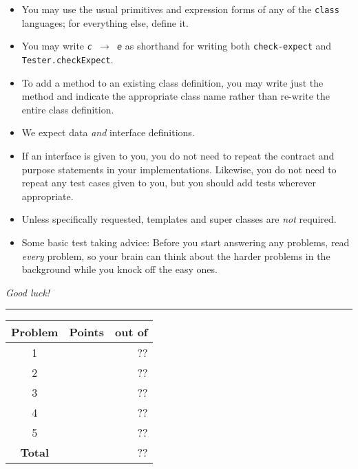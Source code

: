 \documentclass[12pt]{article}                   %
\newcommand\code[1]{\texttt{#1}}
\begin{document}
\noindent\begin{minipage}{8cm}\sloppy
\begin{itemize}
\item You may use the usual primitives and expression forms of any of
  the \code{class} languages; for everything else, define it.

\item You may write {\tt {\slshape c} $\rightarrow$ {\slshape e}} as
  shorthand for writing both {\tt check-expect} and {\tt
    Tester.checkExpect}.

\item To add a method to an existing class definition, you
  may write just the method and indicate the appropriate class name
  rather than re-write the entire class definition.

\item We expect data \emph{and} interface definitions.

\item If an interface is given to you, you do not need to repeat the
  contract and purpose statements in your implementations.  Likewise,
  you do not need to repeat any test cases given to you, but you
  should add tests wherever appropriate.



\item Unless specifically requested, templates and super classes are
  \emph{not} required.

\item Some basic test taking advice: Before you start answering
any problems, read \emph{every} problem, so your brain can  think
about the harder problems in the background while you knock off the easy ones.
\end{itemize}

\bigskip

\emph{Good luck!}
\end{minipage}\hfil\begin{minipage}[t]{6cm}
\rule{1cm}{0pt}\begin{tabular}{|c|l|@{/}r|}
\hline
{\bf Problem} & Points & out of \\ \hline
1 & & ??\\ \hline
2 & & ??\\ \hline
3 & & ??\\ \hline
4 & & ??\\ \hline
5 & & ??\\ \hline
{\bf Total} & & ?? \\ \hline
\end{tabular}
\end{minipage}
\end{document}
